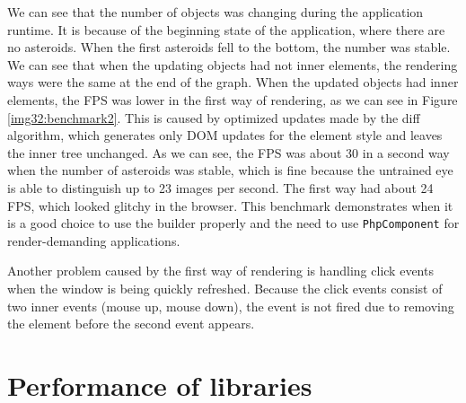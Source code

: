 We can see that the number of objects was changing during the application runtime.
It is because of the beginning state of the application, where there are no asteroids.
When the first asteroids fell to the bottom, the number was stable.
We can see that when the updating objects had not inner elements, the rendering ways were the same at the end of the graph.
When the updated objects had inner elements, the FPS was lower in the first way of rendering, as we can see in Figure \ref{img32:benchmark2}.
This is caused by optimized updates made by the diff algorithm, which generates only DOM updates for the element style and leaves the inner tree unchanged.
As we can see, the FPS was about 30 in a second way when the number of asteroids was stable, which is fine because the untrained eye is able to distinguish up to 23 images per second.
The first way had about 24 FPS, which looked glitchy in the browser.
This benchmark demonstrates when it is a good choice to use the builder properly and the need to use \texttt{PhpComponent} for render-demanding applications.
\par
Another problem caused by the first way of rendering is handling click events when the window is being quickly refreshed.
Because the click events consist of two inner events (mouse up, mouse down), the event is not fired due to removing the element before the second event appears.

\section{Performance of libraries}

